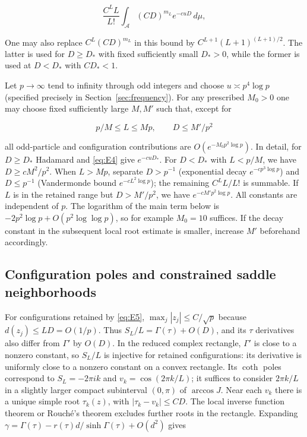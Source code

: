 \documentclass[11pt,a4paper]{article}
\numberwithin{equation}{section}
\theoremstyle{plain}
\theoremstyle{definition}
\begin{document}
\begin{equation}
\frac{C^L L}{L!}\int_{\mathcal A}(C D)^{m_L}e^{-c u D}\,d\mu,
\label{eq:E4}
\end{equation}

One may also replace \(C^L(CD)^{m_L}\) in this bound by \(C^{L+1}(L+1)^{(L+1)/2}\). The latter is used for \(D\ge D_*\) with fixed sufficiently small \(D_*>0\), while the former is used at \(D<D_*\) with \(CD_*<1\).

Let \(p\to\infty\) tend to infinity through odd integers and choose \(u\asymp p^4\log p\) (specified precisely in Section~\ref{sec:frequency}). For any prescribed \(M_0>0\) one may choose fixed sufficiently large \(M,M'\) such that, except for

\begin{equation}
p/M\le L\le M p,\qquad D\le M'/p^2
\label{eq:E5}
\end{equation}

all odd-particle and configuration contributions are \(O(e^{-M_0p^2\log p})\). In detail, for \(D\ge D_*\) Hadamard and \eqref{eq:E4} give \(e^{-c u D_*}\). For \(D<D_*\) with \(L<p/M\), we have \(D\ge c M^2/p^2\). When \(L>Mp\), separate \(D>p^{-1}\) (exponential decay \(e^{-c p^3\log p}\)) and \(D\le p^{-1}\) (Vandermonde bound \(e^{-c L^2\log p}\)); the remaining \(C^L L/L!\) is summable. If \(L\) is in the retained range but \(D>M'/p^2\), we have \(e^{-c M'p^2\log p}\). All constants are independent of \(p\). The logarithm of the main term below is \(-2p^2\log p+O(p^2\log\log p)\), so for example \(M_0=10\) suffices. If the decay constant in the subsequent local root estimate is smaller, increase \(M'\) beforehand accordingly.

\subsection{Configuration poles and constrained saddle neighborhoods}\label{sec:residues}

For configurations retained by \eqref{eq:E5}, \(\max_j|z_j|\le C/\sqrt p\) because \(d(z_j)\le LD=O(1/p)\). Thus \(S_L/L=\Gamma(\tau)+O(D)\), and its \(\tau\) derivatives also differ from \(\Gamma'\) by \(O(D)\). In the reduced complex rectangle, \(\Gamma'\) is close to a nonzero constant, so \(S_L/L\) is injective for retained configurations: its derivative is uniformly close to a nonzero constant on a convex rectangle. Its \(\coth\) poles correspond to \(S_L=-2\pi i k\) and \(v_k=\cos(2\pi k/L)\); it suffices to consider \(2\pi k/L\) in a slightly larger compact subinterval \((0,\pi)\) of \(\arccos J\). Near each \(v_k\) there is a unique simple root \(\tau_k(z)\), with \(|\tau_k-v_k|\le CD\). The local inverse function theorem or Rouché's theorem excludes further roots in the rectangle. Expanding \(\gamma=\Gamma(\tau)-r(\tau)d/\sinh\Gamma(\tau)+O(d^2)\) gives
\end{document}
